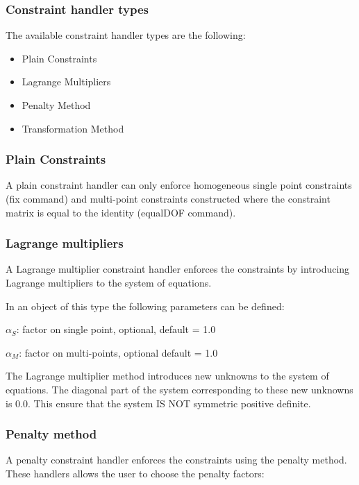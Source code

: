 \subsubsection{Constraint handler types}

The available constraint handler types are the following:

\begin{itemize}
\item Plain Constraints
\item Lagrange Multipliers
\item Penalty Method
\item Transformation Method
\end{itemize}

\subsubsection{Plain Constraints}
A plain constraint handler can only enforce homogeneous single point constraints (fix command) and multi-point constraints constructed where the constraint matrix is equal to the identity (equalDOF command).

\subsubsection{Lagrange multipliers}
A Lagrange multiplier constraint handler enforces the constraints by introducing Lagrange multipliers to the system of equations.

In an object of this type the following parameters can be defined:

\begin{description}
  \item{$\alpha_S$}: factor on single point, optional, default = 1.0
  \item{$\alpha_M$}: factor on multi-points, optional default = 1.0 
\end{description}

The Lagrange multiplier method introduces new unknowns to the system of equations. The diagonal part of the system corresponding to these new unknowns is 0.0. This ensure that the system IS NOT symmetric positive definite.



\subsubsection{Penalty method}
A penalty constraint handler enforces the constraints using the penalty method. These handlers allows the user to choose the penalty factors:

